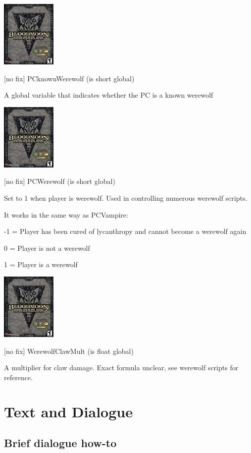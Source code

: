 \documentclass[
]{article}
\begin{document}
\includegraphics{media/image7.png}

{[}no fix{]} PCknownWerewolf (is short global)

A global variable that indicates whether the PC is a known werewolf

\includegraphics{media/image7.png}

{[}no fix{]} PCWerewolf (is short global)

Set to 1 when player is werewolf. Used in controlling numerous werewolf
scripts.

It works in the same way as PCVampire:

-1 = Player has been cured of lycanthropy and cannot become a werewolf
again

0 = Player is not a werewolf

1 = Player is a werewolf

\includegraphics{media/image7.png}

{[}no fix{]} WerewolfClawMult (is float global)

A multiplier for claw damage. Exact formula unclear, see werewolf
scripts for reference.

\hypertarget{text-and-dialogue}{%
\section{\texorpdfstring{\hfill\break
Text and Dialogue}{ Text and Dialogue}}\label{text-and-dialogue}}

\hypertarget{brief-dialogue-how-to}{%
\subsection{Brief dialogue how-to}\label{brief-dialogue-how-to}}
\end{document}
